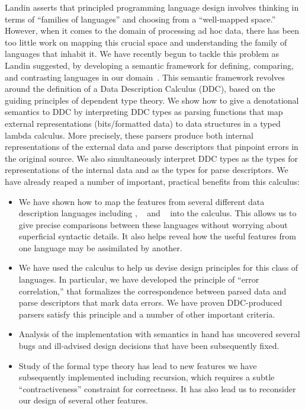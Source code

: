 Landin asserts that principled programming language design involves
thinking in terms of ``families of languages'' and choosing from a
``well-mapped space.''  However, when it comes to the domain of
processing ad hoc data, there has been too little work on mapping this
crucial space and understanding the family of languages that
inhabit it.  We have recently begun to tackle this problem
as Landin suggested, by developing a semantic
framework for defining, comparing, and contrasting languages
in our domain~\cite{fisher+:700}.  This semantic framework revolves around the
definition of a Data Description Calculus (DDC),
based on the guiding principles of dependent type theory.  
We show how to give a denotational semantics
to DDC by interpreting DDC
types as parsing functions that map external representations (bits/formatted
data)
to data structures in a typed lambda calculus.  More precisely,
these parsers produce both 
internal representations of the external data and
parse descriptors that pinpoint errors in the original source.
We also simultaneously interpret DDC types as the types for
representations of the internal data and as the types for parse descriptors.
We have already reaped a number of important, practical benefits from this calculus:
\begin{itemize}
\item We have shown how to map the features from several different data 
description languages including \pads, \packettypes{}~\cite{sigcomm00} and
\datascript{}~\cite{gpce02} into the calculus.  This allows us to give
precise comparisons between these languages without worrying about
superficial syntactic details.  It also helps reveal how the useful features
from one language may be assimilated by another.
\item We have used the calculus to help us devise design
principles for this class of languages.  In particular, we
have developed the principle of ``error correlation,'' that formalizes
the correspondence between parsed data and parse descriptors that mark
data errors.  We have proven DDC-produced parsers satisfy this principle
and a number of other important criteria.
\item Analysis of the \pads{} implementation with semantics in hand
has uncovered several bugs and ill-advised design decisions
that have been subsequently fixed.
\item Study of the formal type theory has lead to new features we have 
subsequently implemented including recursion, which requires a subtle 
``contractiveness'' constraint for correctness.  It has also lead us
to reconsider our design of several other features.
\end{itemize}

